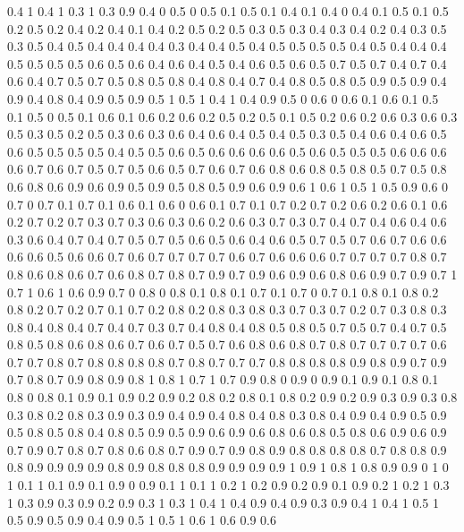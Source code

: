 0.4 1
0.4 1
0.3 1
0.3 0.9
0.4 0
0.5 0
0.5 0.1
0.5 0.1
0.4 0.1
0.4 0
0.4 0.1
0.5 0.1
0.5 0.2
0.5 0.2
0.4 0.2
0.4 0.1
0.4 0.2
0.5 0.2
0.5 0.3
0.5 0.3
0.4 0.3
0.4 0.2
0.4 0.3
0.5 0.3
0.5 0.4
0.5 0.4
0.4 0.4
0.4 0.3
0.4 0.4
0.5 0.4
0.5 0.5
0.5 0.5
0.4 0.5
0.4 0.4
0.4 0.5
0.5 0.5
0.5 0.6
0.5 0.6
0.4 0.6
0.4 0.5
0.4 0.6
0.5 0.6
0.5 0.7
0.5 0.7
0.4 0.7
0.4 0.6
0.4 0.7
0.5 0.7
0.5 0.8
0.5 0.8
0.4 0.8
0.4 0.7
0.4 0.8
0.5 0.8
0.5 0.9
0.5 0.9
0.4 0.9
0.4 0.8
0.4 0.9
0.5 0.9
0.5 1
0.5 1
0.4 1
0.4 0.9
0.5 0
0.6 0
0.6 0.1
0.6 0.1
0.5 0.1
0.5 0
0.5 0.1
0.6 0.1
0.6 0.2
0.6 0.2
0.5 0.2
0.5 0.1
0.5 0.2
0.6 0.2
0.6 0.3
0.6 0.3
0.5 0.3
0.5 0.2
0.5 0.3
0.6 0.3
0.6 0.4
0.6 0.4
0.5 0.4
0.5 0.3
0.5 0.4
0.6 0.4
0.6 0.5
0.6 0.5
0.5 0.5
0.5 0.4
0.5 0.5
0.6 0.5
0.6 0.6
0.6 0.6
0.5 0.6
0.5 0.5
0.5 0.6
0.6 0.6
0.6 0.7
0.6 0.7
0.5 0.7
0.5 0.6
0.5 0.7
0.6 0.7
0.6 0.8
0.6 0.8
0.5 0.8
0.5 0.7
0.5 0.8
0.6 0.8
0.6 0.9
0.6 0.9
0.5 0.9
0.5 0.8
0.5 0.9
0.6 0.9
0.6 1
0.6 1
0.5 1
0.5 0.9
0.6 0
0.7 0
0.7 0.1
0.7 0.1
0.6 0.1
0.6 0
0.6 0.1
0.7 0.1
0.7 0.2
0.7 0.2
0.6 0.2
0.6 0.1
0.6 0.2
0.7 0.2
0.7 0.3
0.7 0.3
0.6 0.3
0.6 0.2
0.6 0.3
0.7 0.3
0.7 0.4
0.7 0.4
0.6 0.4
0.6 0.3
0.6 0.4
0.7 0.4
0.7 0.5
0.7 0.5
0.6 0.5
0.6 0.4
0.6 0.5
0.7 0.5
0.7 0.6
0.7 0.6
0.6 0.6
0.6 0.5
0.6 0.6
0.7 0.6
0.7 0.7
0.7 0.7
0.6 0.7
0.6 0.6
0.6 0.7
0.7 0.7
0.7 0.8
0.7 0.8
0.6 0.8
0.6 0.7
0.6 0.8
0.7 0.8
0.7 0.9
0.7 0.9
0.6 0.9
0.6 0.8
0.6 0.9
0.7 0.9
0.7 1
0.7 1
0.6 1
0.6 0.9
0.7 0
0.8 0
0.8 0.1
0.8 0.1
0.7 0.1
0.7 0
0.7 0.1
0.8 0.1
0.8 0.2
0.8 0.2
0.7 0.2
0.7 0.1
0.7 0.2
0.8 0.2
0.8 0.3
0.8 0.3
0.7 0.3
0.7 0.2
0.7 0.3
0.8 0.3
0.8 0.4
0.8 0.4
0.7 0.4
0.7 0.3
0.7 0.4
0.8 0.4
0.8 0.5
0.8 0.5
0.7 0.5
0.7 0.4
0.7 0.5
0.8 0.5
0.8 0.6
0.8 0.6
0.7 0.6
0.7 0.5
0.7 0.6
0.8 0.6
0.8 0.7
0.8 0.7
0.7 0.7
0.7 0.6
0.7 0.7
0.8 0.7
0.8 0.8
0.8 0.8
0.7 0.8
0.7 0.7
0.7 0.8
0.8 0.8
0.8 0.9
0.8 0.9
0.7 0.9
0.7 0.8
0.7 0.9
0.8 0.9
0.8 1
0.8 1
0.7 1
0.7 0.9
0.8 0
0.9 0
0.9 0.1
0.9 0.1
0.8 0.1
0.8 0
0.8 0.1
0.9 0.1
0.9 0.2
0.9 0.2
0.8 0.2
0.8 0.1
0.8 0.2
0.9 0.2
0.9 0.3
0.9 0.3
0.8 0.3
0.8 0.2
0.8 0.3
0.9 0.3
0.9 0.4
0.9 0.4
0.8 0.4
0.8 0.3
0.8 0.4
0.9 0.4
0.9 0.5
0.9 0.5
0.8 0.5
0.8 0.4
0.8 0.5
0.9 0.5
0.9 0.6
0.9 0.6
0.8 0.6
0.8 0.5
0.8 0.6
0.9 0.6
0.9 0.7
0.9 0.7
0.8 0.7
0.8 0.6
0.8 0.7
0.9 0.7
0.9 0.8
0.9 0.8
0.8 0.8
0.8 0.7
0.8 0.8
0.9 0.8
0.9 0.9
0.9 0.9
0.8 0.9
0.8 0.8
0.8 0.9
0.9 0.9
0.9 1
0.9 1
0.8 1
0.8 0.9
0.9 0
1 0
1 0.1
1 0.1
0.9 0.1
0.9 0
0.9 0.1
1 0.1
1 0.2
1 0.2
0.9 0.2
0.9 0.1
0.9 0.2
1 0.2
1 0.3
1 0.3
0.9 0.3
0.9 0.2
0.9 0.3
1 0.3
1 0.4
1 0.4
0.9 0.4
0.9 0.3
0.9 0.4
1 0.4
1 0.5
1 0.5
0.9 0.5
0.9 0.4
0.9 0.5
1 0.5
1 0.6
1 0.6
0.9 0.6
